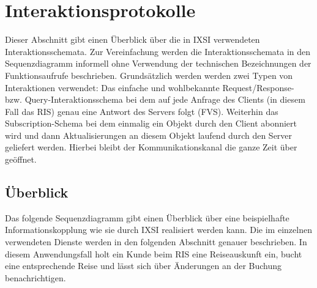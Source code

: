 \chapter{Interaktionsprotokolle}
\label{cha:Interaktionsprotokolle}
Dieser Abschnitt gibt einen Überblick über die in IXSI verwendeten Interaktionsschemata. Zur Vereinfachung werden die Interaktionsschemata in den Sequenzdiagramm informell ohne Verwendung der technischen Bezeichnungen der Funktionsaufrufe beschrieben. Grundsätzlich werden werden zwei Typen von Interaktionen verwendet: Das einfache und wohlbekannte Request/Response- bzw. Query-Interaktionsschema bei dem auf jede Anfrage des Clients (in diesem Fall das RIS) genau eine Antwort des Servers folgt (FVS). Weiterhin das Subscription-Schema bei dem einmalig ein Objekt durch den Client abonniert wird und dann Aktualisierungen an diesem Objekt laufend durch den Server geliefert werden. Hierbei bleibt der Kommunikationskanal die ganze Zeit über geöffnet. 


\section{Überblick}
Das folgende Sequenzdiagramm gibt einen Überblick über eine beispielhafte Informationskopplung wie sie durch IXSI realisiert werden kann. Die im einzelnen verwendeten Dienste werden in den folgenden Abschnitt genauer beschrieben. In diesem Anwendungsfall holt ein Kunde beim RIS eine Reiseauskunft ein, bucht eine entsprechende Reise und lässt sich über Änderungen an der Buchung benachrichtigen. 


